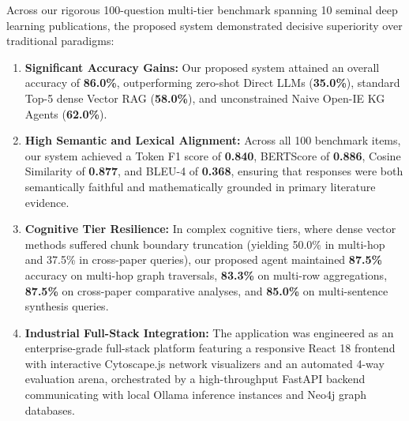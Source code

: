 Across our rigorous 100-question multi-tier benchmark spanning 10 seminal deep learning publications, the proposed system demonstrated decisive superiority over traditional paradigms:
\begin{enumerate}
    \item \textbf{Significant Accuracy Gains:} Our proposed system attained an overall accuracy of \textbf{86.0\%}, outperforming zero-shot Direct LLMs (\textbf{35.0\%}), standard Top-5 dense Vector RAG (\textbf{58.0\%}), and unconstrained Naive Open-IE KG Agents (\textbf{62.0\%}).
    \item \textbf{High Semantic and Lexical Alignment:} Across all 100 benchmark items, our system achieved a Token F1 score of \textbf{0.840}, BERTScore of \textbf{0.886}, Cosine Similarity of \textbf{0.877}, and BLEU-4 of \textbf{0.368}, ensuring that responses were both semantically faithful and mathematically grounded in primary literature evidence.
    \item \textbf{Cognitive Tier Resilience:} In complex cognitive tiers, where dense vector methods suffered chunk boundary truncation (yielding 50.0\% in multi-hop and 37.5\% in cross-paper queries), our proposed agent maintained \textbf{87.5\%} accuracy on multi-hop graph traversals, \textbf{83.3\%} on multi-row aggregations, \textbf{87.5\%} on cross-paper comparative analyses, and \textbf{85.0\%} on multi-sentence synthesis queries.
    \item \textbf{Industrial Full-Stack Integration:} The application was engineered as an enterprise-grade full-stack platform featuring a responsive React 18 frontend with interactive Cytoscape.js network visualizers and an automated 4-way evaluation arena, orchestrated by a high-throughput FastAPI backend communicating with local Ollama inference instances and Neo4j graph databases.
\end{enumerate}

